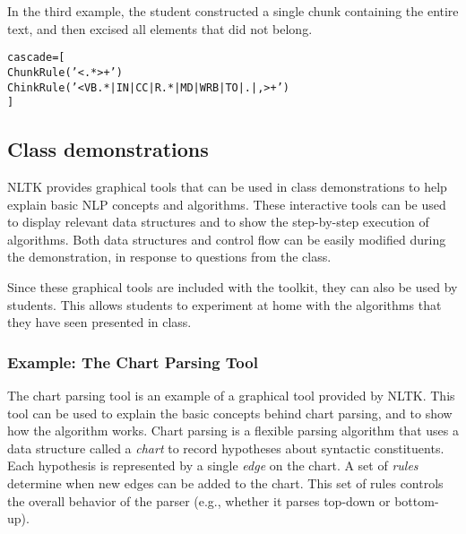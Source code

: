 \documentclass[11pt]{article}
\newenvironment{sv}{\small\begin{alltt}}{\end{alltt}\normalsize}
\begin{document}
In the third example, the student constructed a single chunk
containing the entire text, and then excised all elements that did not
belong.

\begin{sv}
cascade = [
  ChunkRule('<.*>+')
  ChinkRule('<VB.*|IN|CC|R.*|MD|WRB|TO|.|,>+')
]
\end{sv}


%

\subsection{Class demonstrations}

NLTK provides graphical tools that can be used in class demonstrations
to help explain basic NLP concepts and algorithms.  These interactive
tools can be used to display relevant data structures and to show the
step-by-step execution of algorithms.  Both data structures and
control flow can be easily modified during the demonstration, in
response to questions from the class.

Since these graphical tools are included with the toolkit, they can
also be used by students.  This allows students to experiment at home
with the algorithms that they have seen presented in class.

\subsubsection*{Example: The Chart Parsing Tool}

The chart parsing tool is an example of a graphical tool provided by
NLTK.  This tool can be used to explain the basic concepts behind
chart parsing, and to show how the algorithm works.  Chart parsing is
a flexible parsing algorithm that uses a data structure called a
\emph{chart} to record hypotheses about syntactic constituents.  Each
hypothesis is represented by a single \emph{edge} on the chart.  A set
of \emph{rules} determine when new edges can be added to the chart.
This set of rules controls the overall behavior of the parser (e.g.,
whether it parses top-down or bottom-up).
\end{document}
